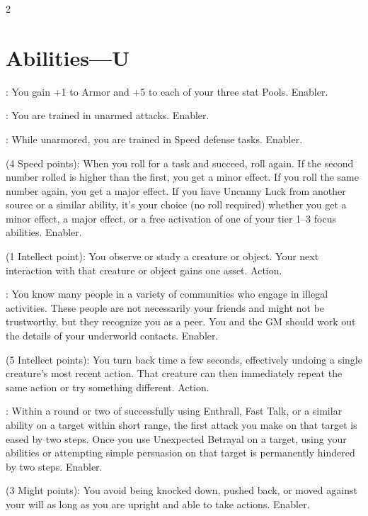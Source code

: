 \begin{multicols}{2}

\section{Abilities—U}

: You gain +1 to Armor and +5 to each of your three stat Pools. Enabler. 
 
: You are trained in unarmed attacks. Enabler.
 
: While unarmored, you are trained in Speed defense tasks. Enabler. 
 
 (4 Speed points): When you roll for a task and succeed, roll again. If the second number rolled is higher than the first, you get a minor effect. If you roll the same number again, you get a major effect. If you have Uncanny Luck from another source or a similar ability, it’s your choice (no roll required) whether you get a minor effect, a major effect, or a free activation of one of your tier 1–3 focus abilities. Enabler. 
 
 (1 Intellect point): You observe or study a creature or object. Your next interaction with that creature or object gains one asset. Action. 
 
: You know many people in a variety of communities who engage in illegal activities. These people are not necessarily your friends and might not be trustworthy, but they recognize you as a peer. You and the GM should work out the details of your underworld contacts. Enabler. 
 
 (5 Intellect points): You turn back time a few seconds, effectively undoing a single creature’s most recent action. That creature can then immediately repeat the same action or try something different. Action. 
 
: Within a round or two of successfully using Enthrall, Fast Talk, or a similar ability on a target within short range, the first attack you make on that target is eased by two steps. Once you use Unexpected Betrayal on a target, using your abilities or attempting simple persuasion on that target is permanently hindered by two steps. Enabler. 
 
 (3 Might points): You avoid being knocked down, pushed back, or moved against your will as long as you are upright and able to take actions. Enabler. 
 

\end{multicols}

